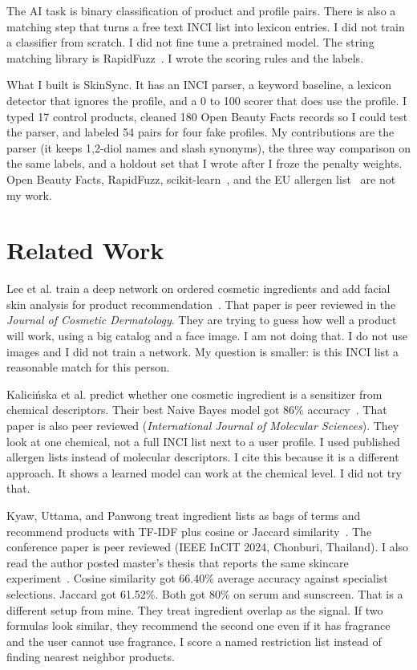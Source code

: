 \documentclass[conference]{IEEEtran}
\begin{document}
The AI task is binary classification of product and profile pairs. There is also a matching step that turns a free text INCI list into lexicon entries. I did not train a classifier from scratch. I did not fine tune a pretrained model. The string matching library is RapidFuzz~\cite{bachmann2025rapidfuzz}. I wrote the scoring rules and the labels.

What I built is SkinSync. It has an INCI parser, a keyword baseline, a lexicon detector that ignores the profile, and a 0 to 100 scorer that does use the profile. I typed 17 control products, cleaned 180 Open Beauty Facts records so I could test the parser, and labeled 54 pairs for four fake profiles. My contributions are the parser (it keeps 1,2-diol names and slash synonyms), the three way comparison on the same labels, and a holdout set that I wrote after I froze the penalty weights. Open Beauty Facts, RapidFuzz, scikit-learn~\cite{pedregosa2011sklearn}, and the EU allergen list~\cite{eu1223} are not my work.

\section{Related Work}
Lee et al. train a deep network on ordered cosmetic ingredients and add facial skin analysis for product recommendation~\cite{lee2024jcd}. That paper is peer reviewed in the \emph{Journal of Cosmetic Dermatology}. They are trying to guess how well a product will work, using a big catalog and a face image. I am not doing that. I do not use images and I did not train a network. My question is smaller: is this INCI list a reasonable match for this person.

Kalici\'{n}ska et al. predict whether one cosmetic ingredient is a sensitizer from chemical descriptors. Their best Naive Bayes model got 86\% accuracy~\cite{kalicinska2023ijms}. That paper is also peer reviewed (\emph{International Journal of Molecular Sciences}). They look at one chemical, not a full INCI list next to a user profile. I used published allergen lists instead of molecular descriptors. I cite this because it is a different approach. It shows a learned model can work at the chemical level. I did not try that.

Kyaw, Uttama, and Panwong treat ingredient lists as bags of terms and recommend products with TF-IDF plus cosine or Jaccard similarity~\cite{kyaw2024incit}. The conference paper is peer reviewed (IEEE InCIT 2024, Chonburi, Thailand). I also read the author posted master's thesis that reports the same skincare experiment~\cite{kyaw2024thesis}. Cosine similarity got 66.40\% average accuracy against specialist selections. Jaccard got 61.52\%. Both got 80\% on serum and sunscreen. That is a different setup from mine. They treat ingredient overlap as the signal. If two formulas look similar, they recommend the second one even if it has fragrance and the user cannot use fragrance. I score a named restriction list instead of finding nearest neighbor products.
\end{document}
